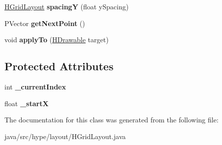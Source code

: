 \begin{DoxyCompactItemize}
\item 
\hypertarget{classhype_1_1layout_1_1_h_grid_layout_a99e58673120e870c4f5f596dfbc75c3b}{\hyperlink{classhype_1_1layout_1_1_h_grid_layout}{H\-Grid\-Layout} {\bfseries spacing\-Y} (float y\-Spacing)}\label{classhype_1_1layout_1_1_h_grid_layout_a99e58673120e870c4f5f596dfbc75c3b}

\item 
\hypertarget{classhype_1_1layout_1_1_h_grid_layout_a6a11960b000ae105846ec25740434851}{P\-Vector {\bfseries get\-Next\-Point} ()}\label{classhype_1_1layout_1_1_h_grid_layout_a6a11960b000ae105846ec25740434851}

\item 
\hypertarget{classhype_1_1layout_1_1_h_grid_layout_a91d7d95849d4c9a9396c87ba6433f99b}{void {\bfseries apply\-To} (\hyperlink{classhype_1_1drawable_1_1_h_drawable}{H\-Drawable} target)}\label{classhype_1_1layout_1_1_h_grid_layout_a91d7d95849d4c9a9396c87ba6433f99b}

\end{DoxyCompactItemize}
\subsection*{Protected Attributes}
\begin{DoxyCompactItemize}
\item 
\hypertarget{classhype_1_1layout_1_1_h_grid_layout_aff606e11fbf16dea38b279a9838472e7}{int {\bfseries \-\_\-current\-Index}}\label{classhype_1_1layout_1_1_h_grid_layout_aff606e11fbf16dea38b279a9838472e7}

\item 
\hypertarget{classhype_1_1layout_1_1_h_grid_layout_a2e35053d040218e53532d5fc5dbf7e58}{float {\bfseries \-\_\-start\-X}}\label{classhype_1_1layout_1_1_h_grid_layout_a2e35053d040218e53532d5fc5dbf7e58}

\end{DoxyCompactItemize}


The documentation for this class was generated from the following file\-:\begin{DoxyCompactItemize}
\item 
java/src/hype/layout/H\-Grid\-Layout.\-java\end{DoxyCompactItemize}
